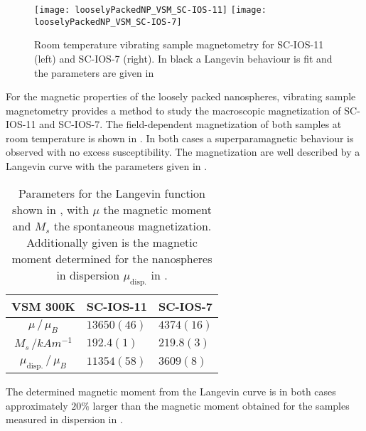 \documentclass[\main/dresen_thesis.tex]{subfiles}
\begin{document}
  \label{sec:looselyPackedNS:layer:vsm}
  \begin{figure}[tb]
    \centering
    \texttt{[image: looselyPackedNP\_VSM\_SC-IOS-11]}
    \texttt{[image: looselyPackedNP\_VSM\_SC-IOS-7]}
    \caption{\label{fig:looselyPackedNP:layer:vsm}Room temperature vibrating sample magnetometry for SC-IOS-11 (left) and SC-IOS-7 (right). In black a Langevin behaviour is fit and the parameters are given in }
  \end{figure}

  For the magnetic properties of the loosely packed nanospheres, vibrating sample magnetometry provides a method to study the macroscopic magnetization of SC-IOS-11 and SC-IOS-7.
  The field-dependent magnetization of both samples at room temperature is shown in .
  In both cases a superparamagnetic behaviour is observed with no excess susceptibility.
  The magnetization are well described by a Langevin curve with the parameters given in .

  \begin{table}[!htbp]
    \centering
    \caption{\label{tab:looselyPackedNP:layer:vsm}Parameters for the Langevin function shown in , with $\mu$ the magnetic moment and $M_s$ the spontaneous magnetization. Additionally given is the magnetic moment determined for the nanospheres in dispersion $\mu_\mathrm{disp.}$ in .}
    \begin{tabular}{ c | l | l }
      \rule{0pt}{2ex} \textbf{VSM \@ 300K} & SC-IOS-11 & SC-IOS-7 \\
      \hline
      \rule{0pt}{2ex} $\mu \, / \, \mu_B$           & $13650(46)$   & $4374(16)$\\
      \rule{0pt}{2ex} $M_s \, /  \unit{kAm^{-1}}$   & $192.4(1)$    & $219.8(3)$\\
      \hline
      $\mu_\mathrm{disp.} \, / \, \mu_B$            & $11354(58)$   & $3609(8)$\\
      \hline
    \end{tabular}
  \end{table}
  The determined magnetic moment from the Langevin curve is in both cases approximately $20 \%$ larger than the magnetic moment obtained for the samples measured in dispersion in .
\end{document}
